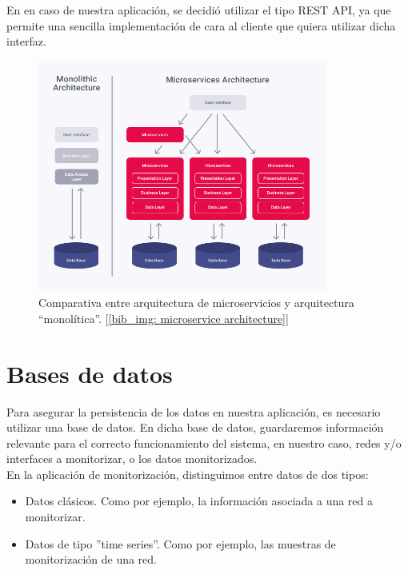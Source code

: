\documentclass[a4paper, oneside, 12pt]{book}
\begin{document}
	\noindent En en caso de nuestra aplicación, se decidió utilizar el tipo REST API, ya que permite una sencilla implementación de cara al cliente que quiera utilizar dicha interfaz.
	
	\begin{figure}[h!]
		\begin{center}
			\includegraphics[width=0.85\textwidth]{img/microservice_architecture.png}
			\caption{Comparativa entre arquitectura de microservicios y arquitectura ``monolítica''. [\ref{bib_img: microservice architecture}]}
			\label{img: microservice architecture}
		\end{center}
	\end{figure}
	
	
	\pagebreak
	
	\section{Bases de datos}
	
	\noindent Para asegurar la persistencia de los datos en nuestra aplicación, es necesario utilizar una base de datos. En dicha base de datos, guardaremos información relevante para el correcto funcionamiento del sistema, en nuestro caso, redes y/o interfaces a monitorizar, o los datos monitorizados. \\
	
	\noindent En la aplicación de monitorización, distinguimos entre datos de dos tipos:
	
	\begin{itemize}
		\item Datos clásicos. Como por ejemplo, la información asociada a una red a monitorizar.
		\item Datos de tipo ''time series''. Como por ejemplo, las muestras de monitorización de una red.
	\end{itemize}
\end{document}
